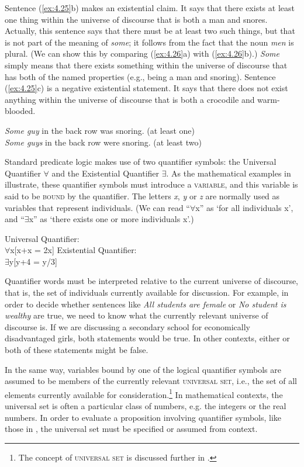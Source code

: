 Sentence (\ref{ex:4.25}b) makes an existential claim. It says that there exists at least one thing within the universe of discourse that is both a man and snores. Actually, this sentence says that there must be at least two such things, but that is not part of the meaning of \textit{some}; it follows from the fact that the noun \textit{men} is plural. (We can show this by comparing (\ref{ex:4.26}a) with (\ref{ex:4.26}b).) \textit{Some} simply means that there exists something within the universe of discourse that has both of the named properties (e.g., being a man and snoring). Sentence (\ref{ex:4.25}c) is a negative existential statement. It says that there does not exist anything within the universe of discourse that is both a crocodile and warm-blooded.


\ea \label{ex:4.26}
\ea \textit{Some guy} in the back row was snoring.  (at least one)\\
\ex \textit{Some guys} in the back row were snoring.  (at least two)
                       \z
\z

Standard predicate logic makes use of two quantifier symbols: the Universal Quantifier ${\forall}$ and the Existential Quantifier ${\exists}$. As the mathematical examples in  illustrate, these quantifier symbols must introduce a \textsc{variable}, and this variable is said to be \textsc{bound} by the quantifier. The letters \textit{x}, \textit{y} or \textit{z} are normally used as variables that represent individuals. (We can read “${\forall}$x” as ‘for all individuals x’, and “${\exists}$x” as ‘there exists one or more individuals x’.) 

\ea \label{ex:4.27}
\ea  Universal Quantifier:\\
${\forall}$x[x+x = 2x]
\ex  Existential Quantifier:\\
${\exists}$y[y+4 = y/3]
\z \z

Quantifier words must be interpreted relative to the current universe of discourse, that is, the set of individuals currently available for discussion. For example, in order to decide whether sentences like \textit{All students are female} or \textit{No student is wealthy} are true, we need to know what the currently relevant universe of discourse is. If we are discussing a secondary school for economically disadvantaged girls, both statements would be true. In other contexts, either or both of these statements might be false.


In the same way, variables bound by one of the logical quantifier symbols are assumed to be members of the currently relevant \textsc{universal set}, i.e., the set of all elements currently available for consideration.\footnote{The concept of \textsc{universal set} is discussed further in .} In mathematical contexts, the universal set is often a particular class of numbers, e.g. the integers or the real numbers. In order to evaluate a proposition involving quantifier symbols, like those in , the universal set must be specified or assumed from context.



